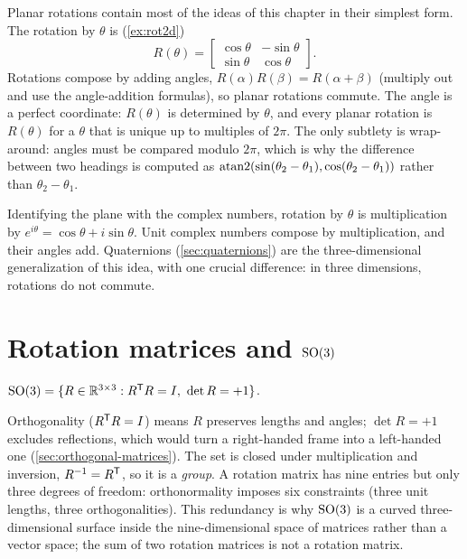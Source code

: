 Planar rotations contain most of the ideas of this chapter in their simplest form. The rotation by $\theta$ is (\cref{ex:rot2d})
\begin{equation}
  R(\theta) = \begin{bmatrix} \cos\theta & -\sin\theta \\ \sin\theta & \cos\theta \end{bmatrix}.
\end{equation}
Rotations compose by adding angles, $R(\alpha)R(\beta) = R(\alpha + \beta)$ (multiply out and use the angle-addition formulas), so planar
rotations commute. The angle is a perfect coordinate: $R(\theta)$ is determined by $\theta$, and every planar rotation is $R(\theta)$ for a
$\theta$ that is unique up to multiples of $2\pi$. The only subtlety is wrap-around: angles must be compared modulo $2\pi$, which is why the
difference between two headings is computed as $\operatorname{atan2}(\sin(\theta_2 - \theta_1), \cos(\theta_2 - \theta_1))$ rather than $\theta_2 - \theta_1$.

Identifying the plane with the complex numbers, rotation by $\theta$ is multiplication by $e^{i\theta} = \cos\theta + i\sin\theta$. Unit complex
numbers compose by multiplication, and their angles add. Quaternions (\cref{sec:quaternions}) are the three-dimensional generalization of
this idea, with one crucial difference: in three dimensions, rotations do not commute.

\section{Rotation matrices and \texorpdfstring{$\mathrm{SO}(3)$}{SO(3)}}

\begin{definition}
$\SO = \{ R \in \R^{3\times3} : R\T R = I,\ \det R = +1 \}$.
\end{definition}

Orthogonality ($R^{\mathsf{T}} R = I$) means $R$ preserves lengths and angles; $\det R = +1$ excludes reflections, which would turn a right-handed
frame into a left-handed one (\cref{sec:orthogonal-matrices}). The set is closed under multiplication and inversion, $R^{-1} = R^{\mathsf{T}}$, so it is
a \emph{group}. A rotation matrix has nine entries but only three degrees of freedom: orthonormality imposes six constraints (three unit
lengths, three orthogonalities). This redundancy is why $\mathrm{SO}(3)$ is a curved three-dimensional surface inside the nine-dimensional space of
matrices rather than a vector space; the sum of two rotation matrices is not a rotation matrix.

